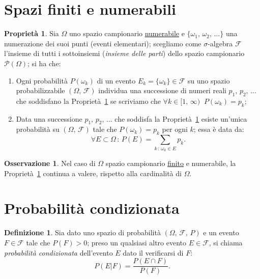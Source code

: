 \documentclass[12pt,openany]{amsbook}
\theoremstyle{plain}
\numberwithin{equation}{section} %
\theoremstyle{definition}
\newtheorem{defn}[thm]{Definizione}
\newtheorem{prty}[thm]{Proprietà}
\newtheorem{obsv}[thm]{Osservazione}
\newcommand\nbdash{\nobreakdash-\hspace{0pt}}
\begin{document}
        \section{Spazi finiti e numerabili}
        \begin{prty}\label{prty:Spazi_numerabili}
            Sia $\Omega$ uno spazio campionario \underline{numerabile} e  $\{\omega_1,\,\omega_2,\,\ldots\}$ una numera\-zione dei suoi punti (eventi elementari); scegliamo come $\sigma$\nbdash algebra  $\mathscr{F}$ l'insieme di tutti i sottoinsiemi (\textit{insieme delle parti}) dello spazio campionario  $\mathscr{P}(\Omega)$; si ha che:
                \begin{enumerate}
                    \item Ogni probabilità $P({\omega_k})$ di un evento $E_k = \{\omega_k\} \in \mathscr{F}$ su uno spazio probabiliz\-zabile $(\Omega,\,\mathscr{F})$ individua una successione di numeri reali $p_1,\,p_2,\,\ldots$ che soddisfano la Proprietà~\ref{prty:Spazi_numerabili} se scriviamo che $\forall k \in [1,\,\infty)\,\:\,P({\omega_k}) = p_k$;
                    \item Data una successione $p_1,\,p_2,\,\ldots$ che soddisfa la Proprietà~\ref{prty:Spazi_numerabili} esiste un'unica probabilità su $(\Omega,\,\mathscr{F})$ tale che  $P({\omega_k}) = p_k$ per ogni  $k$; essa è data da: \[
                            \forall E \subset \Omega\,:\,P(E) = \sum_{k\,:\,\omega_k \in E} p_k
                    .\] 
                \end{enumerate}
            \end{prty}
            \begin{obsv}
                Nel caso di $\Omega$ spazio campionario \underline{finito} e numerabile, la Proprietà~\ref{prty:Spazi_numerabili} continua a valere, rispetto alla cardinalità di $\Omega$.
            \end{obsv}
        \section{Probabilità condizionata}
        \begin{defn}\label{defn:Probabilità_condizionata}
                Sia dato uno spazio di probabilità $(\Omega,\,\mathscr{F},\,P)$ e un evento $F \in \mathscr{F}$ tale che $P(F) > 0$; preso un qualsiasi altro evento $E \in \mathscr{F}$, si chiama \textit{probabilità condizionata} dell'evento $E$ dato il verificarsi di $F$:
                \begin{equation}\label{eq:Formula_probabilità_condizionata}
                    P(E|F) = \frac{P(E \cap F)}{P(F)}
                .
                \end{equation}
            \end{defn}
\end{document}
